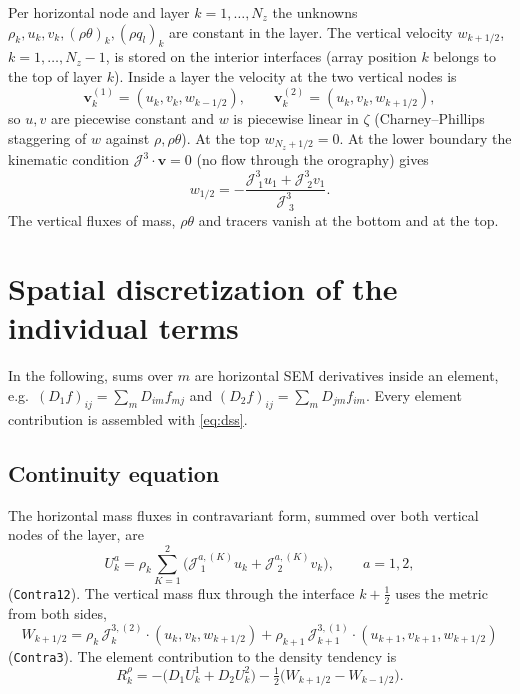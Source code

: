 \documentclass[11pt,a4paper]{article}
\newcommand{\vv}{\bm{v}}
\newcommand{\Jm}{\mathcal{J}}
\newcommand{\code}[1]{\texttt{#1}}
\begin{document}
Per horizontal node and layer $k=1,\dots,N_z$ the unknowns
$\rho_k, u_k, v_k, (\rho\theta)_k, (\rho q_l)_k$ are constant in the layer.
The vertical velocity $w_{k+1/2}$, $k=1,\dots,N_z-1$, is stored on the interior
interfaces (array position $k$ belongs to the top of layer $k$). Inside a
layer the velocity at the two vertical nodes is
\begin{equation}
  \vv^{(1)}_k = (u_k, v_k, w_{k-1/2}), \qquad \vv^{(2)}_k = (u_k, v_k, w_{k+1/2}),
\end{equation}
so $u,v$ are piecewise constant and $w$ is piecewise linear in $\zeta$
(Charney--Phillips staggering of $w$ against $\rho,\rho\theta$).
At the top $w_{N_z+1/2}=0$. At the lower boundary the kinematic condition
$\Jm^3\cdot\vv = 0$ (no flow through the orography) gives
\begin{equation}
  w_{1/2} = -\frac{\Jm^3_{\;1}u_1 + \Jm^3_{\;2}v_1}{\Jm^3_{\;3}}.
\end{equation}
The vertical fluxes of mass, $\rho\theta$ and tracers vanish at the bottom and
at the top.

\section{Spatial discretization of the individual terms}

In the following, sums over $m$ are horizontal SEM derivatives inside an
element, e.g.\ $(D_1 f)_{ij} = \sum_m D_{im}f_{mj}$ and
$(D_2 f)_{ij} = \sum_m D_{jm}f_{im}$. Every element contribution is assembled
with \eqref{eq:dss}.

\subsection{Continuity equation}

The horizontal mass fluxes in contravariant form, summed over both vertical
nodes of the layer, are
\begin{equation}
  U^a_k = \rho_k \sum_{K=1}^2 \bigl(\Jm^{a,(K)}_{\;1} u_k + \Jm^{a,(K)}_{\;2} v_k\bigr),
  \qquad a = 1,2,
\end{equation}
(\code{Contra12}). The vertical mass flux through the interface $k+\tfrac12$
uses the metric from both sides,
\begin{equation}
  W_{k+1/2} = \rho_k\,\Jm^{3,(2)}_k\cdot(u_k,v_k,w_{k+1/2})
    + \rho_{k+1}\,\Jm^{3,(1)}_{k+1}\cdot(u_{k+1},v_{k+1},w_{k+1/2})
\end{equation}
(\code{Contra3}). The element contribution to the density tendency is
\begin{equation}
  R^\rho_k = -\bigl(D_1 U^1_k + D_2 U^2_k\bigr)
     - \tfrac12\bigl(W_{k+1/2} - W_{k-1/2}\bigr).
\end{equation}
\end{document}
